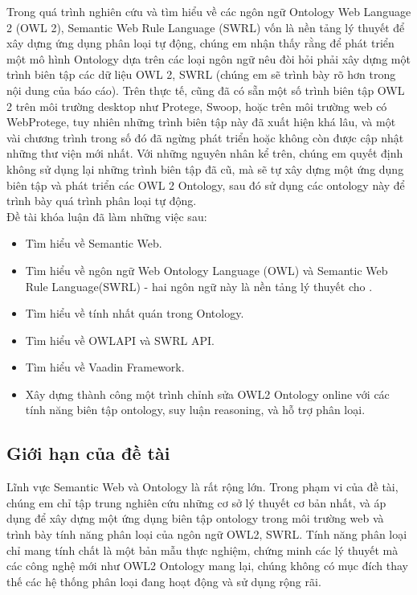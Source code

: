 Trong quá trình nghiên cứu và tìm hiểu về các ngôn ngữ Ontology Web Language 2 (OWL 2), Semantic Web Rule Language (SWRL) vốn là nền tảng lý thuyết để xây dựng ứng dụng phân loại tự động, chúng em nhận thấy rằng để phát triển một mô hình Ontology dựa trên các loại ngôn ngữ nêu đòi hỏi phải xây dựng một trình biên tập các dữ liệu OWL 2, SWRL (chúng em sẽ trình bày rõ hơn trong nội dung của báo cáo). Trên thực tế, cũng đã có sẵn một số trình biên tập OWL 2 trên môi trường desktop như Protege, Swoop, hoặc trên môi trường web có WebProtege, tuy nhiên những trình biên tập này đã xuất hiện khá lâu, và một vài chương trình trong số đó đã ngừng phát triển hoặc không còn được cập nhật những thư viện mới nhất. Với những nguyên nhân kể trên, chúng em quyết định không sử dụng lại những trình biên tập đã cũ, mà sẽ tự xây dựng một ứng dụng biên tập và phát triển các OWL 2 Ontology, sau đó sử dụng các ontology này để trình bày quá trình phân loại tự động.
\\
Đề tài khóa luận đã làm những việc sau:
\begin{itemize}
\item Tìm hiểu về Semantic Web.
\item Tìm hiểu về ngôn ngữ Web Ontology Language (OWL) và Semantic Web Rule Language(SWRL) - hai ngôn ngữ này là nền tảng lý thuyết cho .
\item Tìm hiểu về tính nhất quán trong Ontology.
\item Tìm hiểu về OWLAPI và SWRL API.
\item Tìm hiểu về Vaadin Framework.
\item Xây dựng thành công một trình chỉnh sửa OWL2 Ontology online với các tính năng biên tập ontology, suy luận reasoning, và hỗ trợ phân loại.
\end{itemize}
\subsection{Giới hạn của đề tài}
Lĩnh vực Semantic Web và Ontology là rất rộng lớn. Trong phạm vi của đề tài, chúng em chỉ tập trung nghiên cứu những cơ sở lý thuyết cơ bản nhất, và áp dụng để xây dựng một ứng dụng biên tập ontology trong môi trường web và trình bày tính năng phân loại của ngôn ngữ OWL2, SWRL. Tính năng phân loại chỉ mang tính chất là một bản mẫu thực nghiệm, chứng minh các lý thuyết mà các công nghệ mới như OWL2 Ontology mang lại, chúng không có mục đích thay thế các hệ thống phân loại đang hoạt động và sử dụng rộng rãi.
